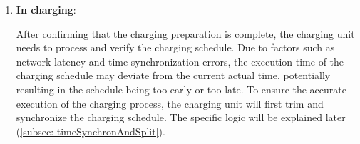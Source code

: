 \documentclass[
	english,
	ruledheaders=section,%
	class=report,%
	thesis={type=Report},%
	accentcolor=9c,%
	custommargins=true,%
	marginpar=false,%
	parskip=half-,%
	fontsize=11pt,%
	logofile={img/tuda_logo.pdf}, %
]{tudapub}
\begin{document}
\begin{enumerate}[label=\Alph*.]
    
    
    \item \textbf{In charging}:
    \label{item:inCharging}
    

    

    After confirming that the charging preparation is complete, the charging unit needs to process and verify the charging schedule. Due to factors such as network latency and time synchronization errors, the execution time of the charging schedule may deviate from the current actual time, potentially resulting in the schedule being too early or too late. To ensure the accurate execution of the charging process, the charging unit will first trim and synchronize the charging schedule. The specific logic will be explained later (\autoref{subsec: timeSynchronAndSplit}).
    


\end{enumerate}
\end{document}

